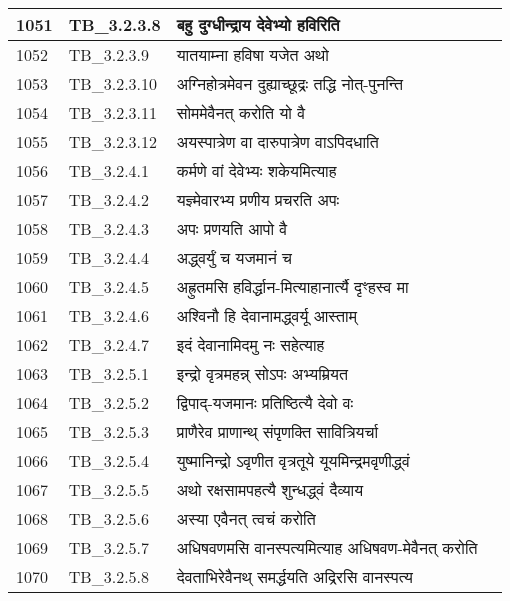 \documentclass[17pt]{extarticle}
\begin{document}
\begin{longtable}{||p{0.4in}||p{0.9in}||p{4.0in}||p{0.9in}||}
        \hline
            1051 & TB\_3.2.3.8 & बहु दुग्धीन्द्राय देवेभ्यो हविरिति &      \\
        \hline
            1052 & TB\_3.2.3.9 & यातयाम्ना हविषा यजेत अथो &      \\
        \hline
            1053 & TB\_3.2.3.10 & अग्निहोत्रमेवन दुह्याच्छूद्रः तद्धि नोत्{-}पुनन्ति &      \\
        \hline
            1054 & TB\_3.2.3.11 & सोममेवैनत् करोति यो वै &      \\
        \hline
            1055 & TB\_3.2.3.12 & अयस्पात्रेण वा दारुपात्रेण वाऽपिदधाति &      \\
        \hline
            1056 & TB\_3.2.4.1 & कर्मणे वां देवेभ्यः शकेयमित्याह &      \\
        \hline
            1057 & TB\_3.2.4.2 & यज्ञ्मेवारभ्य प्रणीय प्रचरति अपः &      \\
        \hline
            1058 & TB\_3.2.4.3 & अपः प्रणयति आपो वै &      \\
        \hline
            1059 & TB\_3.2.4.4 & अद्ध्वर्युं च यजमानं च &      \\
        \hline
            1060 & TB\_3.2.4.5 & अह्रुतमसि हविर्द्धान{-}मित्याहानार्त्यै दृꣳहस्व मा &      \\
        \hline
            1061 & TB\_3.2.4.6 & अश्विनौ हि देवानामद्ध्वर्यू आस्ताम् &      \\
        \hline
            1062 & TB\_3.2.4.7 & इदं देवानामिदमु नः सहेत्याह &      \\
        \hline
            1063 & TB\_3.2.5.1 & इन्द्रो वृत्रमहन्न् सोऽपः अभ्यम्रियत &      \\
        \hline
            1064 & TB\_3.2.5.2 & द्विपाद्{-}यजमानः प्रतिष्ठित्यै देवो वः &      \\
        \hline
            1065 & TB\_3.2.5.3 & प्राणैरेव प्राणान्थ् संपृणक्ति सावित्रियर्चा &      \\
        \hline
            1066 & TB\_3.2.5.4 & युष्मानिन्द्रो ऽवृणीत वृत्रतूये यूयमिन्द्रमवृणीद्ध्वं &      \\
        \hline
            1067 & TB\_3.2.5.5 & अथो रक्षसामपहत्यै शुन्धद्ध्वं दैव्याय &      \\
        \hline
            1068 & TB\_3.2.5.6 & अस्या एवैनत् त्वचं करोति &      \\
        \hline
            1069 & TB\_3.2.5.7 & अधिषवणमसि वानस्पत्यमित्याह अधिषवण{-}मेवैनत् करोति &      \\
        \hline
            1070 & TB\_3.2.5.8 & देवताभिरेवैनथ् समर्द्धयति अद्रिरसि वानस्पत्य &      \\

\end{longtable}
\end{document}
